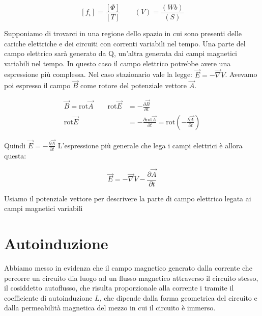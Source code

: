 \[
	[f_i] = \frac{[\Phi ]}{[T]} \qquad (V)=\frac{(Wb)}{(S)}
\]

Supponiamo di trovarci in una regione dello spazio in cui sono presenti delle cariche elettriche e dei circuiti con correnti variabili nel tempo. Una parte del campo elettrico sarà generato da Q, un'altra generata dai campi magnetici variabili nel tempo. In questo caso il campo elettrico potrebbe avere una espressione più complessa.
Nel caso stazionario vale la legge: $ \vec{E} = -\vec{\nabla} V $.
Avevamo poi espresso il campo $\vec{B}$ come rotore del potenziale vettore $\vec{A}$.

\begin{equation*}
	\begin{aligned}
		\vec{B} =\text{rot}\vec{A} \qquad \text{rot}\vec{E} &= - \frac{\partial \vec{B}}{\partial t} \\
		\text{rot}\vec{E} &= - \frac{\partial \text{rot}\vec{A}}{\partial t} = \text{rot}\left(-\frac{\partial \vec{A}}{\partial t} \right)
	\end{aligned}
\end{equation*}

Quindi $ \vec{E} = - \frac{\partial \vec{A}}{\partial t}  $
L'espressione più generale che lega i campi elettrici è allora questa:

\[
	\boxed{\vec{E} = - \vec{\nabla} V - \frac{\partial \vec{A}}{\partial t}}
\]

Usiamo il potenziale vettore per descrivere la parte di campo elettrico legata ai campi magnetici variabili

\section{Autoinduzione}

Abbiamo messo in evidenza che il campo magnetico generato dalla corrente che percorre un circuito dia luogo ad un flusso magnetico attraverso il circuito stesso, il cosiddetto autoflusso, che risulta proporzionale alla corrente i tramite il coefficiente di autoinduzione $L$, che dipende dalla forma geometrica del circuito e dalla permeabilità magnetica del mezzo in cui il circuito è immerso.

